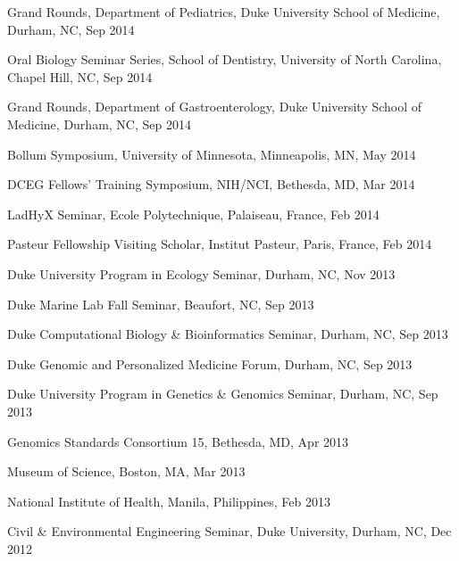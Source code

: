 \documentclass[overlapped,line,11pt]{res}
\begin{document}
\begin{resume}
\begin{revnumerate}[62]
\item {Grand Rounds, Department of Pediatrics, Duke University School of
  Medicine, Durham, NC, Sep 2014
  }

\item {Oral Biology Seminar Series, School of Dentistry, University of
  North Carolina, Chapel Hill, NC, Sep 2014
  }

\item {Grand Rounds, Department of Gastroenterology, Duke University School of
  Medicine, Durham, NC, Sep 2014
  }

\item {Bollum Symposium, University of Minnesota, Minneapolis, MN, May 2014
  }

\item {DCEG Fellows’ Training Symposium, NIH/NCI, Bethesda, MD, Mar 2014
  }

\item {LadHyX Seminar, Ecole
  Polytechnique, Palaiseau, France, Feb 2014}

\item {Pasteur Fellowship Visiting Scholar, Institut Pasteur,
  Paris, France, Feb 2014}

\item {Duke University Program in Ecology Seminar,
  Durham, NC, Nov 2013}

\item {Duke Marine Lab Fall Seminar,
  Beaufort, NC, Sep 2013}

\item {Duke Computational Biology \& Bioinformatics Seminar,
  Durham, NC, Sep 2013}

\item {Duke Genomic and Personalized Medicine Forum,
  Durham, NC, Sep 2013}

\item {Duke University Program in Genetics \& Genomics Seminar,
  Durham, NC, Sep 2013}

\item {Genomics Standards Consortium 15,
  Bethesda, MD, Apr 2013}

\item {Museum of Science, Boston,
  MA, Mar 2013}

\item {National Institute of Health, Manila,
  Philippines, Feb 2013}

\item {Civil \& Environmental Engineering Seminar, Duke University,
  Durham, NC, Dec 2012}


\end{revnumerate}
\end{resume}
\end{document}
